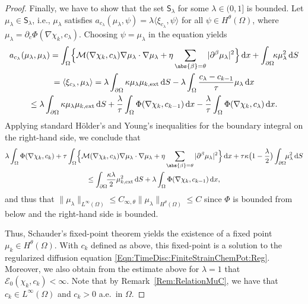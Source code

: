 \documentclass[a4paper,12pt]{article}
\newcommand{\ext}{\mathrm{ext}}
\newcommand{\calM}{\mathcal{M}}
\newcommand{\pl}{\partial}
\newcommand{\dx}{\mathrm{\,d}x}
\newcommand{\dd}{\mathrm{\,d}}
\newcommand{\dS}{\mathrm{\,d}S}
\newcommand{\calE}{\mathcal{E}}
\theoremstyle{plain}
\theoremstyle{definition}
\numberwithin{equation}{section}
\begin{document}
\begin{proof}
Finally, we have to show that the set
$\mathsf{S}_\lambda$ for some $\lambda\in(0,1]$ is bounded. 
Let $\mu_\lambda\in\mathsf{S}_\lambda$, i.e., $\mu_\lambda$ satisfies
$a_{c_\lambda}(\mu_\lambda,\psi)= \lambda \langle\xi_{c_\lambda},\psi\rangle$
for all $\psi\in H^\theta(\Omega)$,
where $\mu_\lambda = \pl_c\Phi(\nabla\chi_k,c_\lambda)$.
Choosing $\psi = \mu_\lambda$ in the equation yields
\begin{multline*}
a_{c_\lambda}(\mu_\lambda,\mu_\lambda) = 
\int_\Omega\!\Big\{  \calM(\nabla\chi_{k}, c_\lambda)\nabla\mu_\lambda \cdot \nabla\mu_\lambda  + \eta\sum_{\abs{\beta}=\theta}|\pl^\beta\mu_\lambda|^2\Big\}\dx + \int_{\pl\Omega}\!\!\kappa\mu_\lambda^2\dS\\
= \langle\xi_{c_\lambda},\mu_\lambda\rangle=\lambda\int_{\pl\Omega}\kappa\mu_\lambda \mu_{k,\ext}\dd S -
\lambda\int_\Omega \frac{c_\lambda-c_{k-1}}{\tau}\mu_\lambda \dd x\\
\leq \lambda\int_{\pl\Omega}\kappa\mu_\lambda \mu_{k,\ext}\dd S 
+\frac{\lambda}{\tau}\int_\Omega \Phi(\nabla \chi_k,c_{k-1})\dd x - \frac{\lambda}{\tau}\int_{\Omega}\Phi(\nabla\chi_k,c_\lambda)\dd x.
\end{multline*}
Applying standard H\"older's and Young's inequalities for the boundary integral on the right-hand side, we conclude that
\begin{multline*}
\lambda \int_{\Omega}\Phi(\nabla \chi_k,c_k)+
\tau\int_\Omega\!\Big\{  \calM(\nabla\chi_{k}, c_\lambda)\nabla\mu_\lambda \cdot \nabla\mu_\lambda  + \eta\sum_{\abs{\beta}=\theta}|\pl^\beta\mu_\lambda|^2\Big\}\dx + \tau\kappa\big(1-\frac{\lambda}{2}\big)\int_{\pl\Omega}\!\!\mu_\lambda^2\dS\\
\leq \int_{\pl\Omega}\!\!\frac{\kappa\lambda}{2}\mu_{k,\ext}^2\dd S+ \lambda\int_\Omega \Phi(\nabla \chi_k,c_{k-1})\dd x,
\end{multline*}
and thus that $\|\mu_\lambda\|_{L^\infty(\Omega)}\leq C_{\infty,\theta}\|\mu_\lambda\|_{H^\theta(\Omega)} \leq C$
since $\Phi$ is bounded from below and the right-hand side is bounded.


Thus, Schauder's fixed-point theorem yields the existence of a fixed point $\mu_k\in H^\theta(\Omega)$. With $c_k$ defined as above, this fixed-point is a solution to the regularized diffusion equation
\eqref{Eqn:TimeDisc:FiniteStrainChemPot:Reg}. Moreover, we also
obtain from the estimate above for $\lambda=1$ 
that $\calE_0(\chi_k,c_k)<\infty$. Note that by Remark~\ref{Rem:RelationMuC}, we have that
$c_k\in L^\infty(\Omega)$ and $c_k>0$ a.e.\ in $\Omega$.

%
%
%
%
%
%
%
%
%
%
%
%
%
%
%
%
%
%
%
%
%
%
%
%
%
%

%
%

%
%
%
%
%
%
%
%
%
%
%

%
%
%
%
%
%
%
%
%
%
%
%
%
%
%
%

%
%
%
%
%
\end{proof}
\end{document}
